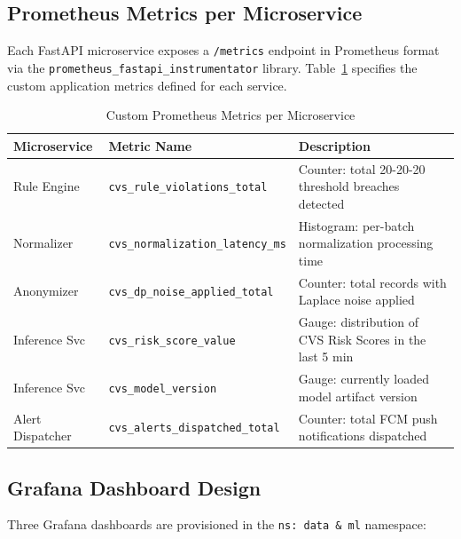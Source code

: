 \documentclass[conference]{IEEEtran}
\begin{document}
\subsection{Prometheus Metrics per Microservice}

Each FastAPI microservice exposes a \texttt{/metrics} endpoint in Prometheus format via
the \texttt{prometheus\_fastapi\_instrumentator} library. Table~\ref{tab:metrics}
specifies the custom application metrics defined for each service.

\begin{table}[H]
  \centering
  \caption{Custom Prometheus Metrics per Microservice}
  \label{tab:metrics}
  \begin{tabularx}{\textwidth}{p{4cm} p{4cm} X}
    \toprule
    \textbf{Microservice} & \textbf{Metric Name} & \textbf{Description} \\
    \midrule
    Rule Engine & \texttt{cvs\_rule\_violations\_total} &
      Counter: total 20-20-20 threshold breaches detected \\
    Normalizer & \texttt{cvs\_normalization\_latency\_ms} &
      Histogram: per-batch normalization processing time \\
    Anonymizer & \texttt{cvs\_dp\_noise\_applied\_total} &
      Counter: total records with Laplace noise applied \\
    Inference Svc & \texttt{cvs\_risk\_score\_value} &
      Gauge: distribution of CVS Risk Scores in the last 5 min \\
    Inference Svc & \texttt{cvs\_model\_version} &
      Gauge: currently loaded model artifact version \\
    Alert Dispatcher & \texttt{cvs\_alerts\_dispatched\_total} &
      Counter: total FCM push notifications dispatched \\
    \bottomrule
  \end{tabularx}
\end{table}

\subsection{Grafana Dashboard Design}

Three Grafana dashboards are provisioned in the \texttt{ns: data \& ml} namespace:
\end{document}
